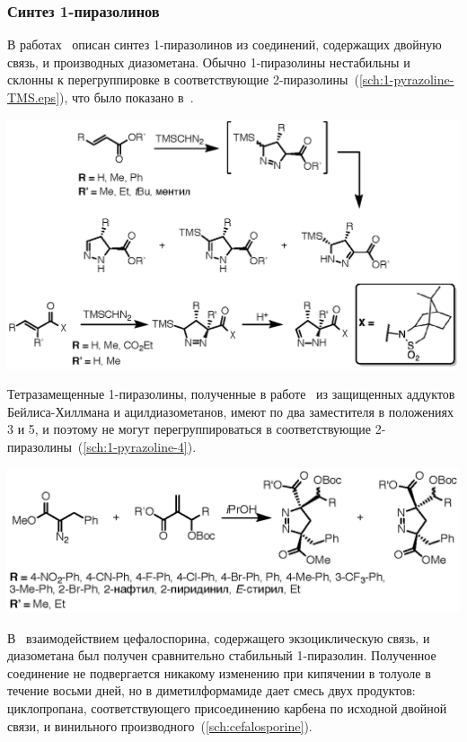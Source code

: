\subsubsection{Синтез 1-пиразолинов}
В работах~\cite{Baldwin1990, Mish1997, Simovic2007, Sun2013} описан синтез 1-пиразолинов из соединений, содержащих двойную связь, и производных диазометана.
Обычно 1-пиразолины нестабильны и склонны к перегруппировке в соответствующие 2-пиразолины~(\ref{sch:1-pyrazoline-TMS.eps}), что было показано в~\cite{Mish1997, Simovic2007}.

\begin{scheme}[h!]
    \centering
    \includegraphics{sections/literature/img/1-pyrazoline-TMS.eps}
    \caption{}
    \label{sch:1-pyrazoline-TMS.eps}
\end{scheme}

Тетразамещенные 1-пиразолины, полученные в работе~\cite{Sun2013} из защищенных аддуктов Бейлиса-Хиллмана и ацилдиазометанов, имеют по два заместителя в положениях 3 и 5, и поэтому не могут перегруппироваться в соответствующие 2-пиразолины~(\ref{sch:1-pyrazoline-4}).

\begin{scheme}[h!]
    \centering
    \includegraphics{sections/literature/img/1-pyrazoline-4.eps}
    \caption{}
    \label{sch:1-pyrazoline-4}
\end{scheme}

В~\cite{Baldwin1990} взаимодействием цефалоспорина, содержащего экзоциклическую связь, и диазометана был получен сравнительно стабильный 1-пиразолин.
Полученное соединение не подвергается никакому изменению при кипячении в толуоле в течение восьми дней, но в диметилформамиде дает смесь двух продуктов: циклопропана, соответствующего присоединению карбена по исходной двойной связи, и винильного производного~(\ref{sch:cefalosporine}).

